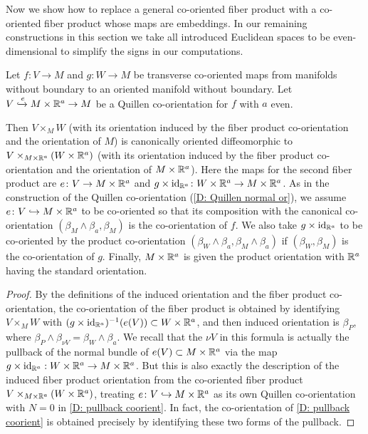 Now we show how to replace a general co-oriented fiber product with a co-oriented fiber product whose maps are embeddings.
In our remaining constructions in this section we take all introduced Euclidean spaces to be even-dimensional to simplify the signs in our computations.

\begin{lemma}
	Let $f \colon V \to M$ and $g \colon W \to M$ be transverse co-oriented maps from manifolds without boundary to an oriented manifold without boundary.
	Let $V\xhookrightarrow{e}M \times \mathbb{R}^a \to M$ be a Quillen co-orientation for $f$ with $a$ even.

	Then $V \times_M W$ (with its orientation induced by the fiber product co-orientation and the orientation of $M$) is canonically oriented diffeomorphic to $V\times_{M \times \mathbb{R}^a }(W \times \mathbb{R}^a )$ (with its orientation induced by the fiber product co-orientation and the orientation of $M \times \mathbb{R}^a $).
	Here the maps for the second fiber product are $e \colon V \to M \times \mathbb{R}^a $ and $g \times \mathrm{id}_{\mathbb{R}^a } \colon W \times \mathbb{R}^a \to M \times \mathbb{R}^a $.
	As in the construction of the Quillen co-orientation (\cref{D: Quillen normal or}), we assume $e \colon V \hookrightarrow M \times \mathbb{R}^a $ to be co-oriented so that its composition with the canonical co-orientation $(\beta_{M}\wedge\beta_a,\beta_M)$ is the co-orientation of $f$.
	We also take $g \times \mathrm{id}_{\mathbb{R}^a }$ to be co-oriented by the product co-orientation $(\beta_W \wedge \beta_a,\beta_M \wedge \beta_a)$ if $(\beta_W,\beta_M)$ is the co-orientation of $g$.
	Finally, $M \times \mathbb{R}^a $ is given the product orientation with $\mathbb{R}^a $ having the standard orientation.
\end{lemma}

\begin{proof}
	By the definitions of the induced orientation and the fiber product co-orientation, the co-orientation of the fiber product is obtained by identifying $V \times_M W$ with $(g\times \mathrm{id}_{\mathbb{R}^a})^{-1}(e(V)) \subset W \times \mathbb{R}^a$, and then induced orientation is $\beta_P$, where $\beta_P \wedge \beta_{\nu V} = \beta_W \wedge \beta_a$.
	We recall that the $\nu V$ in this formula is actually the pullback of the normal bundle of $e(V) \subset M \times \mathbb{R}^a $ via the map $g \times \mathrm{id}_{\mathbb{R}^a }: W \times \mathbb{R}^a \to M \times \mathbb{R}^a $.
	But this is also exactly the description of the induced fiber product orientation from the co-oriented fiber product $V\times_{M \times \mathbb{R}^a }(W \times \mathbb{R}^a )$, treating $e \colon V \hookrightarrow M \times \mathbb{R}^a $ as its own Quillen co-orientation with $N = 0$ in \cref{D: pullback coorient}.
	In fact, the co-orientation of \cref{D: pullback coorient} is obtained precisely by identifying these two forms of the pullback.
\end{proof}

